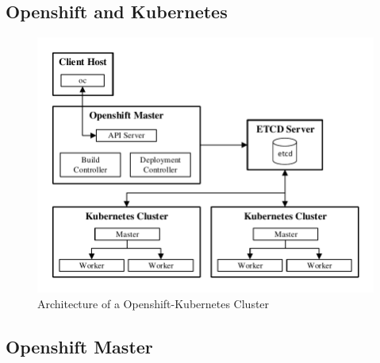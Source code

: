 
\newpage 

\subsection{Openshift and Kubernetes}
\label{sec:paas-openshift-and-kubernetes}

\begin{figure}[htbp]
	\centering
	\includegraphics[scale=1]{images/openshift-kubernetes-cluster-architecture.pdf}
	\caption{Architecture of a Openshift-Kubernetes Cluster}
	\label{fig:paas-openshift-kubernetes-cluster-architecture}
\end{figure} 


\subsection{Openshift Master}
\label{sec:paas-openshift-master}